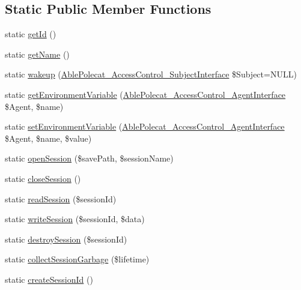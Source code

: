 \subsection*{Static Public Member Functions}
\begin{DoxyCompactItemize}
\item 
static \hyperlink{class_able_polecat___mode___session_acfaa3a96d0cb5a4c0d4d710dcba41e9e}{get\+Id} ()
\item 
static \hyperlink{class_able_polecat___mode___session_a4ef9bd37ba3ce8a13c1e8bcf4f72a630}{get\+Name} ()
\item 
static \hyperlink{class_able_polecat___mode___session_a3f2135f6ad45f51d075657f6d20db2cd}{wakeup} (\hyperlink{interface_able_polecat___access_control___subject_interface}{Able\+Polecat\+\_\+\+Access\+Control\+\_\+\+Subject\+Interface} \$Subject=N\+U\+L\+L)
\item 
static \hyperlink{class_able_polecat___mode___session_a04e7e0f41da8037ae797868b61b6df77}{get\+Environment\+Variable} (\hyperlink{interface_able_polecat___access_control___agent_interface}{Able\+Polecat\+\_\+\+Access\+Control\+\_\+\+Agent\+Interface} \$Agent, \$name)
\item 
static \hyperlink{class_able_polecat___mode___session_a68bdefd00518f09963ea3fa95cd2a242}{set\+Environment\+Variable} (\hyperlink{interface_able_polecat___access_control___agent_interface}{Able\+Polecat\+\_\+\+Access\+Control\+\_\+\+Agent\+Interface} \$Agent, \$name, \$value)
\item 
static \hyperlink{class_able_polecat___mode___session_ae60835168c2d61914c8b76491b5f52a2}{open\+Session} (\$save\+Path, \$session\+Name)
\item 
static \hyperlink{class_able_polecat___mode___session_a5bf8cadb9c0360e64c3b2dc4e1c1f086}{close\+Session} ()
\item 
static \hyperlink{class_able_polecat___mode___session_a065cc1c4e202e7b7543035f944b811de}{read\+Session} (\$session\+Id)
\item 
static \hyperlink{class_able_polecat___mode___session_a9af5947a2535416b5af53db02a47fa19}{write\+Session} (\$session\+Id, \$data)
\item 
static \hyperlink{class_able_polecat___mode___session_a702bed9f8676ac48dc8186bb516d7fe1}{destroy\+Session} (\$session\+Id)
\item 
static \hyperlink{class_able_polecat___mode___session_ab28f62aa08c1b2156d70700ee9bd2504}{collect\+Session\+Garbage} (\$lifetime)
\item 
static \hyperlink{class_able_polecat___mode___session_acb3fc86b241bf55942bd3a72f15bdc18}{create\+Session\+Id} ()
\end{DoxyCompactItemize}
